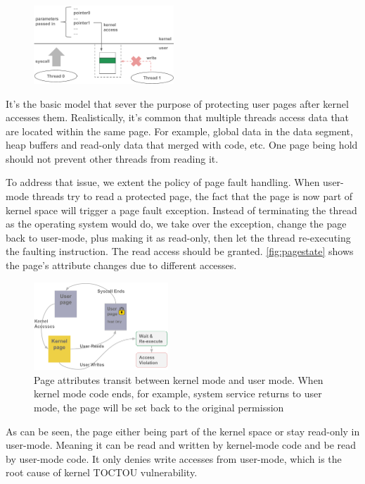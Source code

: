 \begin{figure}[th]
  \includegraphics[width=0.47\textwidth]{figures/denyuserwrite}
  \centering
  \caption{}
  \label{fig:denyuserwrite}
\end{figure}

It's the basic model that sever the purpose of protecting user pages after kernel accesses them. Realistically, it's common that multiple threads access data that are located within the same page. For example, global data in the data segment, heap buffers and read-only data that merged with code, etc. One page being hold should not prevent other threads from reading it.


To address that issue, we extent the policy of page fault handling. When user-mode threads try to read a protected page, the fact that the page is now part of kernel space will trigger a page fault exception. Instead of terminating  the thread as the operating system would do, we take over the exception, change the page back to user-mode, plus making it as read-only, then let the thread re-executing the faulting instruction. The read access should be granted. \autoref{fig:pagestate} shows the page's attribute changes due to different accesses.
 

\begin{figure}[th]
  \includegraphics[width=0.45\textwidth]{figures/pagestate}
  \centering
  \caption{Page attributes transit between kernel mode and user mode. When kernel mode code ends, for example, system service returns to user mode, the page will be set back to the original permission}
  \label{fig:pagestate}
\end{figure}

As can be seen, the page either being part of the kernel space or stay read-only in user-mode. Meaning it can be read and written by kernel-mode code and be read by user-mode code. It only denies write accesses from user-mode, which is the root cause of kernel TOCTOU vulnerability.


